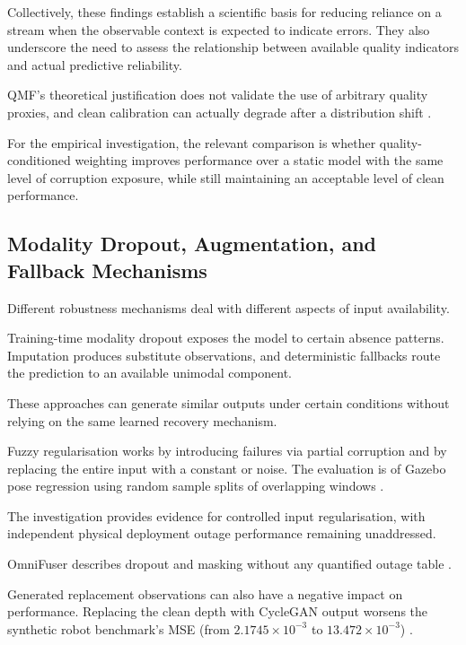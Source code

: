 Collectively, these findings establish a scientific basis for reducing reliance on a stream when the
observable context is expected to indicate errors. They also underscore the need to assess the
relationship between available quality indicators and actual predictive reliability.

QMF's theoretical justification does not validate the use of arbitrary quality proxies, and clean
calibration can actually degrade after a distribution shift \parencite{Zhang2023QMF,P008}.

For the empirical investigation, the relevant comparison is whether quality-conditioned weighting
improves performance over a static model with the same level of corruption exposure, while still
maintaining an acceptable level of clean performance.

\subsection{Modality Dropout, Augmentation, and Fallback Mechanisms}

Different robustness mechanisms deal with different aspects of input availability.

Training-time modality dropout exposes the model to certain absence patterns. Imputation produces
substitute observations, and deterministic fallbacks route the prediction to an available unimodal
component.

These approaches can generate similar outputs under certain conditions without relying on the same
learned recovery mechanism.

Fuzzy regularisation works by introducing failures via partial corruption and by replacing the
entire input with a constant or noise. The evaluation is of Gazebo pose regression using random
sample splits of overlapping windows \parencite[PDF pp.~3--5]{Altinses2023Fuzzy}.

The investigation provides evidence for controlled input regularisation, with independent physical
deployment outage performance remaining unaddressed.

OmniFuser describes dropout and masking without any quantified outage table \parencite[PDF p.~10]{P021}.

Generated replacement observations can also have a negative impact on performance. Replacing the
clean depth with CycleGAN output worsens the synthetic robot benchmark's MSE (from $2.1745 \times
10^{-3}$ to $13.472 \times 10^{-3}$) \parencite[Table~7]{Altinses2025Performance}.

